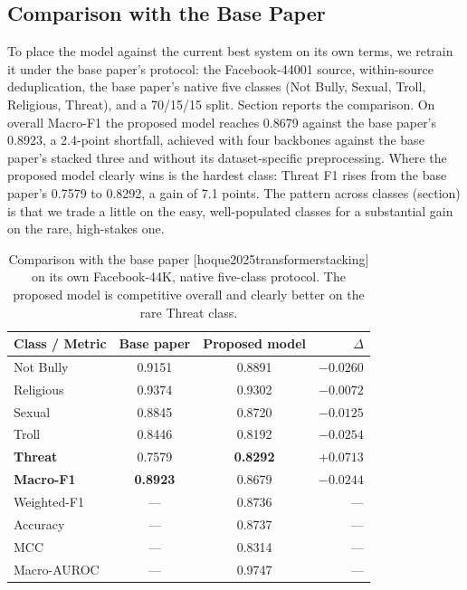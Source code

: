 \documentclass[11pt,a4paper]{article}
\def\citep#1{[#1]}%
\def\Cref#1{Section}%
\def\cref#1{section}%
\def\emph#1{#1}%
\begin{document}
\subsection{Comparison with the Base Paper}
\label{sec:basepaper-results}

To place the model against the current best system on its own terms, we retrain it under the base paper's protocol: the Facebook-44001 source, within-source deduplication, the base paper's native five classes (Not Bully, Sexual, Troll, Religious, Threat), and a 70/15/15 split. \Cref{tab:basepaper} reports the comparison. On overall Macro-F1 the proposed model reaches 0.8679 against the base paper's 0.8923, a 2.4-point shortfall, achieved with four backbones against the base paper's stacked three and without its dataset-specific preprocessing. Where the proposed model clearly wins is the hardest class: \emph{Threat} F1 rises from the base paper's 0.7579 to 0.8292, a gain of 7.1 points. The pattern across classes (\cref{fig:basepaper}) is that we trade a little on the easy, well-populated classes for a substantial gain on the rare, high-stakes one.

\begin{table}[!htbp]
\centering
\caption{Comparison with the base paper \citep{hoque2025transformerstacking} on its own Facebook-44K, native five-class protocol. The proposed model is competitive overall and clearly better on the rare \emph{Threat} class.}
\label{tab:basepaper}
\small
\begin{tabular}{@{}lccr@{}}
\toprule
\textbf{Class / Metric} & \textbf{Base paper} & \textbf{Proposed model} & \textbf{$\Delta$} \\
\midrule
Not Bully & 0.9151 & 0.8891 & $-0.0260$ \\
Religious & 0.9374 & 0.9302 & $-0.0072$ \\
Sexual & 0.8845 & 0.8720 & $-0.0125$ \\
Troll & 0.8446 & 0.8192 & $-0.0254$ \\
\textbf{Threat} & 0.7579 & \textbf{0.8292} & $\mathbf{+0.0713}$ \\
\midrule
\textbf{Macro-F1} & \textbf{0.8923} & 0.8679 & $-0.0244$ \\
Weighted-F1 & --- & 0.8736 & --- \\
Accuracy & --- & 0.8737 & --- \\
MCC & --- & 0.8314 & --- \\
Macro-AUROC & --- & 0.9747 & --- \\
\bottomrule
\end{tabular}
\end{table}
\end{document}
